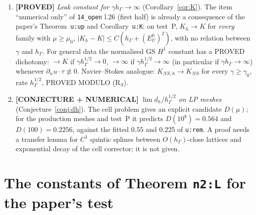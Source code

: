 \documentclass[11pt]{article}
\theoremstyle{definition}
\theoremstyle{remark}
\newcommand{\hG}{h_\Gamma}
\newcommand{\dn}{\partial_n}
\newcommand{\GS}{\mathrm{GS}}
\newcommand{\lab}[1]{\textbf{[#1]}}
\begin{document}
\begin{enumerate}[label=(\alph*)]
$\Gamma_\infty:=\sup_{|\theta|\le\pi/4}\gamma_c(a(\theta))/\cos^2\theta$, $a(\theta)=(L\sec\theta-1)/(2\cos^2\theta)$, $\gamma_c(a)$ is the half-plane lattice threshold (compactly supported fields), and $\Gamma^{\rm cell}_\infty$ is the same with $\gamma_c$ replaced by the periodic cell value $\sup_{J,\phi}\gamma_c(a,J,\phi)$ (Lemma~\ref{lem:floq}).
\lab{NUMERICAL}: the supremum is at $\theta=0$ and Floquet phase $0$, and
\[
\Gamma^{\rm cell}_\infty=\sup_J\gamma_c(\tfrac34,J,0)=21.4080\ \ (\text{all depths}),\qquad 21.4045\ (2\text{ layers}),\qquad 21.3860\ (1\text{ layer}),
\]
which confirms the paper's extrapolated $21.4$ (window Richardson: $21.39$ / $21.41$ for 1 / 2 layers). The two-layer global thresholds for $N=128,\dots,2048$ (new) extrapolate to $21.40452$, against the cell value $21.40452$; the $1/N$ coefficient $21.8$ is predicted as $22.0$ by a harmonic-well/curvature expansion.
\item \lab{PROVED} \emph{Leak constant for $\gamma\hG\to\infty$} (Corollary~\ref{cor:K}). The item ``numerical only'' of \texttt{14\_open} l.26 (first half) is already a consequence of the paper's Theorem~\texttt{u:up} and Corollary~\texttt{u:K}: on test~P, $K_h\to K$ for \emph{every} family with $\mu\ge\mu_0$, $|K_h-K|\le C(\hG+(E^0_U)^2)$, with no relation between $\gamma$ and $\hG$. For general data the normalised $\GS$ $H^1$ constant has a PROVED dichotomy: $\to K$ if $\gamma\hG^{1/2}\to0$, $\to\infty$ if $\gamma\hG^{1/2}\to\infty$ (in particular if $\gamma\hG\to\infty$) whenever $\dn u\cdot\tau\not\equiv0$. Navier--Stokes analogue: $K_{NS,h}\to K_{NS}$ for every $\gamma\ge\gamma_0$, rate $\hG^{1/2}$, PROVED MODULO (R$_S$).
\item \lab{CONJECTURE + NUMERICAL} \emph{$\lim d_h/\hG^{1/2}$ on LP meshes} (Conjecture~\ref{conj:dh}). The cell problem gives an explicit candidate $D(\mu)$; for the production meshes and test~P it predicts $D(10^8)=0.564$ and $D(100)=0.2256$, against the fitted $0.55$ and $0.225$ of \texttt{u:rem}. A proof needs a transfer lemma for $C^1$ quintic splines between $O(\hG)$-close lattices and exponential decay of the cell corrector; it is not given.
\end{enumerate}

\section{The constants of Theorem \texttt{n2:L} for the paper's test}\label{sec:consts}
\end{document}
